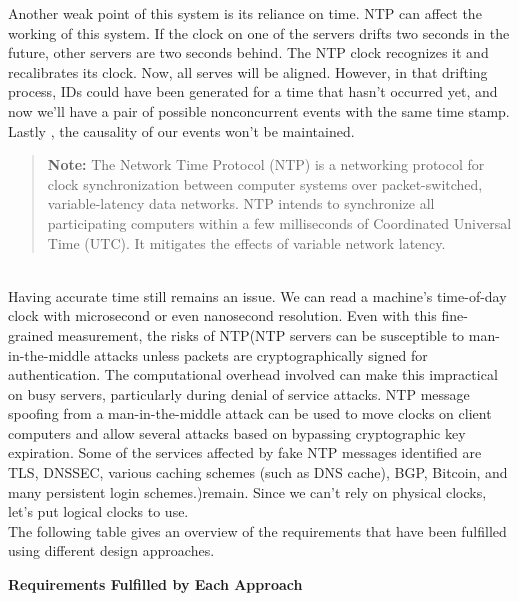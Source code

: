 Another weak point of this system is its reliance on time. NTP can affect the working of this system. If the clock on one of the servers drifts two seconds in the future, other servers are two seconds behind. The NTP clock recognizes it and recalibrates its clock. Now, all serves will be aligned. However, in that drifting process, IDs could have been generated for a time that hasn't occurred yet, and now we'll have a pair of possible nonconcurrent events with the same time stamp. Lastly
, the causality of our events won't be maintained.
\begin{quote}
\textbf{Note:} The Network Time Protocol (NTP) is a networking protocol for clock synchronization between computer systems over packet-switched, variable-latency data networks. NTP intends to synchronize all participating computers within a few milliseconds of Coordinated Universal Time (UTC). It mitigates the effects of variable network latency.
\end{quote}
\\
Having accurate time still remains an issue. We can read a machine's time-of-day clock with microsecond or even nanosecond resolution. Even with this fine-grained measurement, the risks of NTP(NTP servers can be susceptible to man-in-the-middle attacks unless packets are cryptographically signed for authentication. The computational overhead involved can make this impractical on busy servers, particularly during denial of service attacks. NTP message spoofing from a man-in-the-middle attack can be used to move clocks on client computers and allow several attacks based on bypassing cryptographic key expiration. Some of the services affected by fake NTP messages identified are TLS, DNSSEC, various caching schemes (such as DNS cache), BGP, Bitcoin, and many persistent login schemes.)remain. Since we can't rely on physical clocks, let's put logical clocks to use.
\\
The following table gives an overview of the requirements that have been fulfilled using different design approaches.

\textbf{Requirements Fulfilled by Each Approach}

